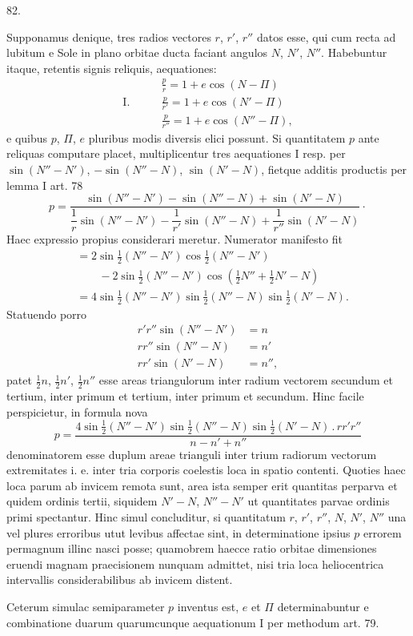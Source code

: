 \par{}\medskip
\hypertarget{native-111-article082}{}
\begin{center}82.\end{center}
Supponamus denique, tres radios vectores $r$, $r'$, $r''$ datos esse, qui cum recta ad lubitum e Sole in plano orbitae ducta faciant angulos $N$, $N'$, $N''$. Habebuntur itaque, retentis signis reliquis, aequationes:
\[
\begin{aligned}
&\frac{p}{r}=1+e\cos(N-\Pi)\\[4pt]
\mathrm{I.}\qquad&\frac{p}{r'}=1+e\cos(N'-\Pi)\\[4pt]
&\frac{p}{r''}=1+e\cos(N''-\Pi),
\end{aligned}
\]
e quibus $p$, $\Pi$, $e$ pluribus modis diversis elici possunt. Si quantitatem $p$ ante reliquas computare placet, multiplicentur tres aequationes I resp. per $\sin(N''-N')$, $-\sin(N''-N)$, $\sin(N'-N)$, fietque additis productis per lemma I art. 78
\[
p=\frac{\sin(N''-N')-\sin(N''-N)+\sin(N'-N)}{\dfrac1r\sin(N''-N')-\dfrac1{r'}\sin(N''-N)+\dfrac1{r''}\sin(N'-N)}\mathpunct{\cdot}
\]
Haec expressio propius considerari meretur. Numerator manifesto fit
\[
\begin{aligned}
&=2\sin\tfrac12(N''-N')\cos\tfrac12(N''-N')\\
&\qquad-2\sin\tfrac12(N''-N')\cos(\tfrac12N''+\tfrac12N'-N)\\
&=4\sin\tfrac12(N''-N')\sin\tfrac12(N''-N)\sin\tfrac12(N'-N).
\end{aligned}
\]
Statuendo porro
\[
\begin{aligned}
r'r''\sin(N''-N')&=n\\
rr''\sin(N''-N)&=n'\\
rr'\sin(N'-N)&=n'',
\end{aligned}
\]
patet $\tfrac12n$, $\tfrac12n'$, $\tfrac12n''$ esse areas triangulorum inter radium vectorem secundum et tertium, inter primum et tertium, inter primum et secundum. Hinc facile perspicietur, in formula nova
\[
p=\frac{4\sin\tfrac12(N''-N')\sin\tfrac12(N''-N)\sin\tfrac12(N'-N)\mathbin{.}rr'r''}{n-n'+n''}
\]
denominatorem esse duplum areae trianguli inter trium radiorum vectorum extremitates i. e. inter tria corporis coelestis loca in spatio contenti. Quoties haec loca parum ab invicem remota sunt, area ista semper erit quantitas perparva et quidem ordinis tertii, siquidem $N'-N$, $N''-N'$ ut quantitates parvae ordinis primi spectantur. Hinc simul concluditur, si quantitatum $r$, $r'$, $r''$, $N$, $N'$, $N''$ una vel plures erroribus utut levibus affectae sint, in determinatione ipsius $p$ errorem permagnum illinc nasci posse; quamobrem haecce ratio orbitae dimensiones eruendi magnam praecisionem nunquam admittet, nisi tria loca heliocentrica intervallis considerabilibus ab invicem distent.

Ceterum simulac semiparameter $p$ inventus est, $e$ et $\Pi$ determinabuntur e combinatione duarum quarumcunque aequationum I per methodum art. 79.
